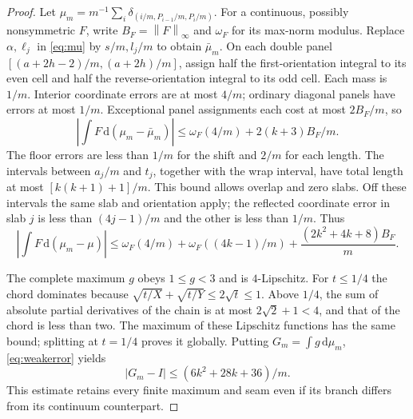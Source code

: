 \documentclass[11pt,letterpaper]{article}
\newcommand{\dd}{\,\mathrm d}
\newcommand{\norm}[1]{\left\lVert#1\right\rVert}
\begin{document}
\begin{proof}
Let $\mu_m=m^{-1}\sum_i\delta_{(i/m,P_{i-1}/m,P_i/m)}$.
For a continuous, possibly nonsymmetric $F$, write
$B_F=\norm F_\infty$ and $\omega_F$ for its max-norm modulus.
Replace $\alpha,\ell_j$ in \eqref{eq:mu} by $s/m,l_j/m$ to obtain
$\bar\mu_m$. On each double panel
$[(a+2h-2)/m,(a+2h)/m]$, assign half the first-orientation integral
to its even cell and half the reverse-orientation integral to its odd
cell. Each mass is $1/m$. Interior coordinate errors are at most $4/m$;
ordinary diagonal panels have errors at most $1/m$. Exceptional panel
assignments each cost at most $2B_F/m$, so
\[
 \left|\int F\dd(\mu_m-\bar\mu_m)\right|
 \le\omega_F(4/m)+2(k+3)B_F/m.
\]
The floor errors are less than $1/m$ for the shift and $2/m$ for each
length. The intervals between $a_j/m$ and $t_j$, together with the wrap
interval, have total length at most $[k(k+1)+1]/m$. This bound allows
overlap and zero slabs. Off these intervals the same slab and orientation
apply; the reflected coordinate error in slab $j$ is less than
$(4j-1)/m$ and the other is less than $1/m$. Thus
\begin{equation}\label{eq:weakerror}
 \left|\int F\dd(\mu_m-\mu)\right|
 \le\omega_F(4/m)+\omega_F((4k-1)/m)
       +\frac{(2k^2+4k+8)B_F}{m}.
\end{equation}

The complete maximum $g$ obeys $1\le g<3$ and is $4$-Lipschitz.
For $t\le1/4$ the chord dominates because
$\sqrt{t/X}+\sqrt{t/Y}\le2\sqrt t\le1$. Above $1/4$, the sum of
absolute partial derivatives of the chain is at most $2\sqrt2+1<4$,
and that of the chord is less than two. The maximum of these Lipschitz
functions has the same bound; splitting at $t=1/4$ proves it globally.
Putting $G_m=\int g\dd\mu_m$, \eqref{eq:weakerror} yields
\begin{equation}\label{eq:scoreerror}
 |G_m-I|\le(6k^2+28k+36)/m.
\end{equation}
This estimate retains every finite maximum and seam even if its branch
differs from its continuum counterpart.


\end{proof}
\end{document}
